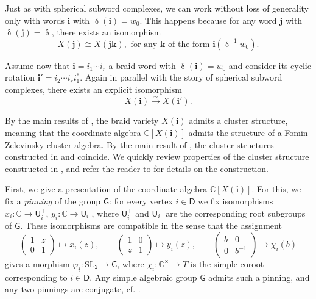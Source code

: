 \documentclass[a4paper, 11pt]{amsart}
\newcommand{\SL}{\mathrm{SL}}
\newcommand{\unipotent}{\mathsf{U}}
\newcommand{\word}[1]{\mathbf{#1}}
\DeclareMathOperator{\dem}{\delta}
\newcommand{\group}{\mathsf{G}}
\newcommand{\C}{\mathbb{C}}
\newcommand{\dynkin}{\mathsf{D}}
\theoremstyle{definition}
\begin{document}
Just as with spherical subword complexes, we can work without loss of generality only with words $\word{i}$ with $\dem(\word{i}) = w_0$. This happens because for any word $\word{j}$ with $\dem(\word{j}) = \dem$, there exists an isomorphism 
\[
X(\word{j}) \cong X(\word{j} \word{k}), \,\, \mbox{for any} \,\, \word{k} \,\, \mbox{of the form} \,\, \word{i}(\dem^{-1}w_0).
\]

Assume now that $\word{i} = i_1\cdots i_r$ a braid word with $\dem(\word{i}) = w_0$ and consider its cyclic rotation $\word{i'} = i_2\cdots i_r i_{1}^*$. Again in parallel with the story of spherical subword complexes, there exists an explicit isomorphism  
\[
X(\word{i}) \overset\sim\to X(\word{i'}).
\]

By the main results of \cite{CGGLSS, GLSB, GLSBS}, the braid variety $X(\word{i})$ admits a cluster structure, meaning that the coordinate algebra $\C[X(\word{i})]$ admits the structure of a Fomin-Zelevinsky cluster algebra. By the main result of \cite{CGGSSBS}, the cluster structures constructed in \cite{CGGLSS} and \cite{GLSB} coincide. We quickly review properties of the cluster structure constructed in \cite{CGGLSS}, and refer the reader to \cite{CGGLSS} for details on the construction.

First, we give a presentation of the coordinate algebra $\C[X(\word{i})]$. For this, we fix a \emph{pinning} of the group $\group$: for every vertex $i \in \dynkin$ we fix isomorphisms $x_i: \C \to \unipotent_i^{+}$, $y_i: \C \to \unipotent_i^{-}$, where $\unipotent_i^{+}$ and $\unipotent_i^{-}$ are the corresponding root subgroups of $\group$. These isomorphisms are compatible in the sense that the assignment
\[
\begin{pmatrix}
    1 & z \\ 0 & 1 
\end{pmatrix}
\mapsto x_i(z), \qquad
\begin{pmatrix}
   1 & 0 \\ z & 1  
\end{pmatrix}
\mapsto y_i(z), \qquad
\begin{pmatrix}
 b & 0 \\ 0 & b^{-1}
\end{pmatrix}
\mapsto \chi_i(b)
\]
gives a morphism $\varphi_i: \SL_2 \to \group$, where $\chi_i: \C^{\times} \to T$ is the simple coroot corresponding to $i \in \dynkin$. Any simple algebraic group $\group$ admits such a pinning, and any two pinnings are conjugate, cf. \cite{lusztig-TP1}.
\end{document}
